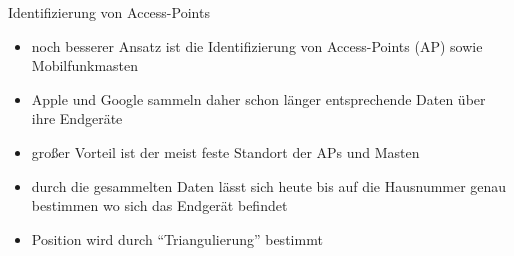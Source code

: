 \begin{frame}{Identifizierung von Access-Points}
\begin{itemize}
  \item noch besserer Ansatz ist die Identifizierung von Access-Points (AP) sowie Mobilfunkmasten
  \item Apple und Google sammeln daher schon länger entsprechende Daten über ihre Endgeräte
  \item großer Vorteil ist der meist feste Standort der APs und Masten
  \item durch die gesammelten Daten lässt sich heute bis auf die Hausnummer genau bestimmen wo sich das Endgerät befindet
  \item Position wird durch "`Triangulierung"' bestimmt
\end{itemize}
\end{frame}

